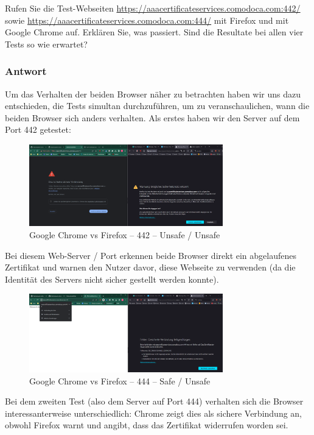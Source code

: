 \documentclass{article}
\begin{document}
Rufen Sie die Test-Webseiten \url{https://aaacertificateservices.comodoca.com:442/} sowie 
\url{https://aaacertificateservices.comodoca.com:444/} mit Firefox und mit Google 
Chrome auf. Erklären Sie, was passiert. Sind die Resultate bei allen vier Tests so 
wie erwartet?

\subsubsection*{Antwort}

Um das Verhalten der beiden Browser näher zu betrachten haben wir uns dazu entschieden, die Tests simultan
durchzuführen, um zu veranschaulichen, wann die beiden Browser sich anders verhalten. Als erstes haben wir den
Server auf dem Port 442 getestet:

\begin{figure}[H]
	\includegraphics[width=0.75\textwidth]{images/05}
	\centering
	\caption{Google Chrome vs Firefox – 442 – Unsafe / Unsafe}
\end{figure}

Bei diesem Web-Server / Port erkennen beide Browser direkt ein abgelaufenes Zertifikat und warnen den
Nutzer davor, diese Webseite zu verwenden (da die Identität des Servers nicht sicher gestellt werden konnte).

\begin{figure}[H]
	\includegraphics[width=0.75\textwidth]{images/06}
	\centering
	\caption{Google Chrome vs Firefox – 444 – Safe / Unsafe}
\end{figure}

Bei dem zweiten Test (also dem Server auf Port 444) verhalten sich die Browser interessanterweise unterschiedlich:
Chrome zeigt dies als sichere Verbindung an, obwohl Firefox warnt und angibt, dass das Zertifikat widerrufen worden sei.
\end{document}
